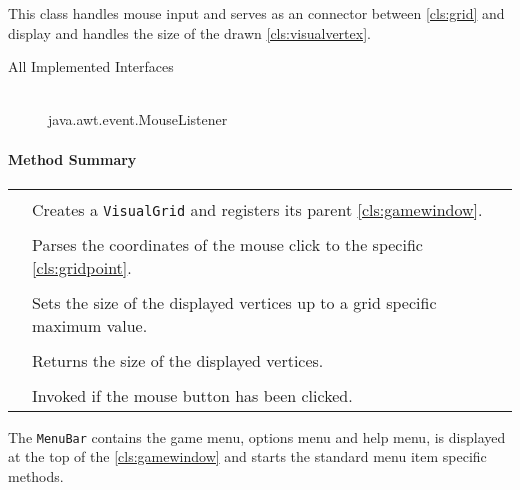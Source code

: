 This class handles mouse input and serves as an connector between \ref{cls:grid} and display and handles the size of the drawn \ref{cls:visualvertex}. \\ 
\begin{description}
	\item[All Implemented Interfaces] \hfill \\
	java.awt.event.MouseListener
\end{description}
\centerdash

\paragraph*{Method Summary}
\paragraph*{}
\begin{longtable}{Lp{10cm}}
	\startmethodtable
	 \\
	& Creates a \texttt{VisualGrid} and registers its parent \ref{cls:gamewindow}. \\
	 \\
	& Parses the coordinates of the mouse click to the specific \ref{cls:gridpoint}. \\
	 \\
	& Sets the size of the displayed vertices up to a grid specific maximum value. \\
	 \\
	& Returns the size of the displayed vertices. \\ 
	 \\
	& Invoked if the mouse button has been clicked. \\ 
	\hline
\end{longtable}
\pagebreak


The \texttt{MenuBar} contains the game menu, options menu and help menu, is displayed at the top of the \ref{cls:gamewindow} and starts the standard menu item specific methods. \\

